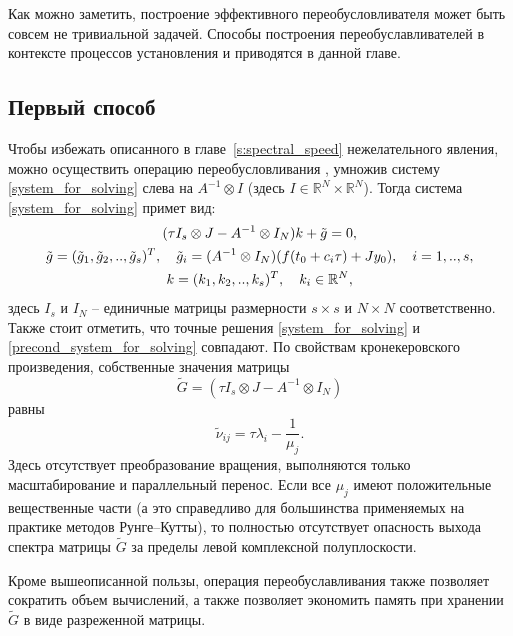 \documentclass[a4paper,14pt]{extreport}
\begin{document}
	Как можно заметить, построение эффективного переобусловливателя может быть совсем не тривиальной задачей. Способы построения переобуславливателей в контексте процессов установления и приводятся в данной главе.
    
  \subsection{Первый способ}
  \label{ss:precond_1}
  Чтобы  избежать описанного в главе~\ref{s:spectral_speed} нежелательного явления, можно осуществить операцию переобусловливания \cite{gomel},\cite{konf_may}  умножив систему \eqref{system_for_solving} слева на $A^{-1}\otimes I$ (здесь $I\in \mathbb{R}^N \times \mathbb{R}^N $). Тогда система \eqref{system_for_solving} примет вид:
\begin{gather}\label{precond_system_for_solving}
(\tau I_s\otimes J-A^{-1}\otimes I_N)k+\tilde g=0,\\
\notag \tilde g=(\tilde g_1,\tilde g_2,..,\tilde g_s)^T, \quad \tilde g_i=(A^{-1}\otimes I_N)(f(t_0+c_i \tau)+Jy_0), \quad i=1,..,s,\\
\notag k=(k_1,k_2,..,k_s)^T, \quad k_i \in \mathbb{R}^N,
\end{gather}
здесь $I_s$ и $I_N$ -- единичные матрицы размерности $s\times s$ и
$N \times N$ соответственно. Также стоит отметить, что точные
решения \eqref{system_for_solving} и
\eqref{precond_system_for_solving} совпадают. По свойствам
кронекеровского произведения, собственные значения
матрицы
$$\tilde G =(\tau I_s\otimes J-A^{-1}\otimes I_N) $$
равны
$$\tilde \nu_{ij} = \tau \lambda_i - \frac{1}{ \mu_j}.$$
Здесь отсутствует преобразование вращения, выполняются только
масштабирование и параллельный перенос.  Если все $\mu_j$ имеют
положительные вещественные части (а это справедливо для большинства
применяемых на практике методов Рунге--Кутты), то полностью
отсутствует опасность выхода спектра матрицы $\tilde G$ за пределы
левой комплексной полуплоскости. 

Кроме вышеописанной пользы, операция переобуславливания также позволяет сократить объем вычислений, а также позволяет экономить память при хранении $\tilde G$ в виде разреженной матрицы\cite{Bondar}.
  
\end{document}
